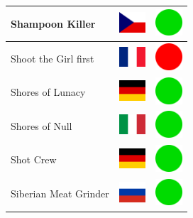 \documentclass[12pt, a4paper, twoside]{report}
\begin{document}
\begin{center}
\begin{longtable}{|p{5cm}|p{2cm}|p{2cm}|}
 Shampoon Killer                                            & \includegraphics[width=1cm]{../4x3/cz} &   \includegraphics[width=1cm]{../likes/y} \\ \hline
 Shoot the Girl first                                       & \includegraphics[width=1cm]{../4x3/fr} &   \includegraphics[width=1cm]{../likes/n} \\ \hline
 Shores of Lunacy                                           & \includegraphics[width=1cm]{../4x3/de} &   \includegraphics[width=1cm]{../likes/y} \\ \hline
 Shores of Null                                             & \includegraphics[width=1cm]{../4x3/it} &   \includegraphics[width=1cm]{../likes/y} \\ \hline
 Shot Crew                                                  & \includegraphics[width=1cm]{../4x3/de} &   \includegraphics[width=1cm]{../likes/y} \\ \hline
 Siberian Meat Grinder                                      & \includegraphics[width=1cm]{../4x3/ru} &   \includegraphics[width=1cm]{../likes/y} \\ \hline

\end{longtable}
\end{center}
\end{document}
